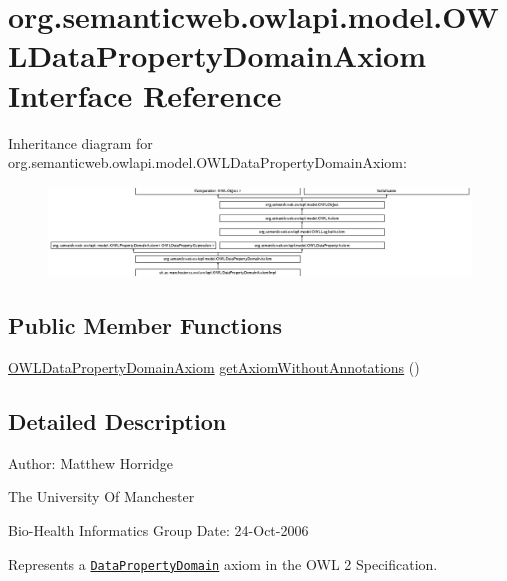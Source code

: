 \hypertarget{interfaceorg_1_1semanticweb_1_1owlapi_1_1model_1_1_o_w_l_data_property_domain_axiom}{\section{org.\-semanticweb.\-owlapi.\-model.\-O\-W\-L\-Data\-Property\-Domain\-Axiom Interface Reference}
\label{interfaceorg_1_1semanticweb_1_1owlapi_1_1model_1_1_o_w_l_data_property_domain_axiom}
}
Inheritance diagram for org.\-semanticweb.\-owlapi.\-model.\-O\-W\-L\-Data\-Property\-Domain\-Axiom\-:\begin{figure}[H]
\begin{center}
\leavevmode
\includegraphics[height=2.393162cm]{interfaceorg_1_1semanticweb_1_1owlapi_1_1model_1_1_o_w_l_data_property_domain_axiom}
\end{center}
\end{figure}
\subsection*{Public Member Functions}
\begin{DoxyCompactItemize}
\item 
\hyperlink{interfaceorg_1_1semanticweb_1_1owlapi_1_1model_1_1_o_w_l_data_property_domain_axiom}{O\-W\-L\-Data\-Property\-Domain\-Axiom} \hyperlink{interfaceorg_1_1semanticweb_1_1owlapi_1_1model_1_1_o_w_l_data_property_domain_axiom_a7a261ca9238b6b20f9b78e0b5c56697a}{get\-Axiom\-Without\-Annotations} ()
\end{DoxyCompactItemize}


\subsection{Detailed Description}
Author\-: Matthew Horridge\par
 The University Of Manchester\par
 Bio-\/\-Health Informatics Group Date\-: 24-\/\-Oct-\/2006 

Represents a \href{http://www.w3.org/TR/2009/REC-owl2-syntax-20091027/#Data_Property_Domain}{\tt Data\-Property\-Domain} axiom in the O\-W\-L 2 Specification. 

